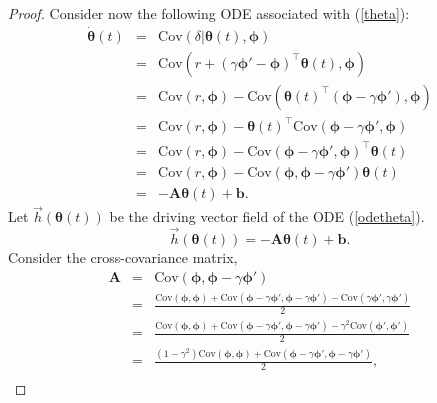 \begin{proof}
    Consider now the following ODE associated with (\ref{theta}):
    \begin{equation}
    \begin{array}{ccl}
    \dot{\bm{\bm{\theta}}}(t)&=&\mathrm{Cov}(\delta|\bm{\bm{\theta}}(t),\bm{\bm{\phi}})\\
    &=&\mathrm{Cov}(r+(\gamma\bm{\bm{\phi}}'-\bm{\bm{\phi}})^{\top}\bm{\bm{\theta}}(t),\bm{\bm{\phi}})\\
    &=&\mathrm{Cov}(r,\bm{\bm{\phi}})-\mathrm{Cov}(\bm{\bm{\theta}}(t)^{\top}(\bm{\bm{\phi}}-\gamma\bm{\bm{\phi}}'),\bm{\bm{\phi}})\\
    &=&\mathrm{Cov}(r,\bm{\bm{\phi}})-\bm{\bm{\theta}}(t)^{\top}\mathrm{Cov}(\bm{\bm{\phi}}-\gamma\bm{\bm{\phi}}',\bm{\bm{\phi}})\\
    &=&\mathrm{Cov}(r,\bm{\bm{\phi}})-\mathrm{Cov}(\bm{\bm{\phi}}-\gamma\bm{\bm{\phi}}',\bm{\bm{\phi}})^{\top}\bm{\bm{\theta}}(t)\\
    &=&\mathrm{Cov}(r,\bm{\bm{\phi}})-\mathrm{Cov}(\bm{\bm{\phi}},\bm{\bm{\phi}}-\gamma\bm{\bm{\phi}}')\bm{\bm{\theta}}(t)\\
    &=&-\textbf{A}\bm{\bm{\theta}}(t)+\bm{b}.
    \end{array}
    \label{odetheta}
    \end{equation}
    Let $\vec{h}(\bm{\bm{\theta}}(t))$ be the driving vector field of the ODE
    (\ref{odetheta}).
    \begin{equation*}
    \vec{h}(\bm{\bm{\theta}}(t))=-\textbf{A}\bm{\bm{\theta}}(t)+\bm{b}.
    \end{equation*}
     Consider the cross-covariance matrix,
    \begin{equation}
    \begin{array}{ccl}
        \textbf{A} &=& \mathrm{Cov}(\bm{\bm{\phi}},\bm{\bm{\phi}}-\gamma\bm{\bm{\phi}}')\\
      &=&\frac{\mathrm{Cov}(\bm{\bm{\phi}},\bm{\bm{\phi}})+\mathrm{Cov}(\bm{\bm{\phi}}-\gamma\bm{\bm{\phi}}',\bm{\bm{\phi}}-\gamma\bm{\bm{\phi}}')-\mathrm{Cov}(\gamma\bm{\bm{\phi}}',\gamma\bm{\bm{\phi}}')}{2}\\
      &=&\frac{\mathrm{Cov}(\bm{\bm{\phi}},\bm{\bm{\phi}})+\mathrm{Cov}(\bm{\bm{\phi}}-\gamma\bm{\bm{\phi}}',\bm{\bm{\phi}}-\gamma\bm{\bm{\phi}}')-\gamma^2\mathrm{Cov}(\bm{\bm{\phi}}',\bm{\bm{\phi}}')}{2}\\
      &=&\frac{(1-\gamma^2)\mathrm{Cov}(\bm{\bm{\phi}},\bm{\bm{\phi}})+\mathrm{Cov}(\bm{\bm{\phi}}-\gamma\bm{\bm{\phi}}',\bm{\bm{\phi}}-\gamma\bm{\bm{\phi}}')}{2},\\

\end{array}
\end{equation}
\end{proof}
